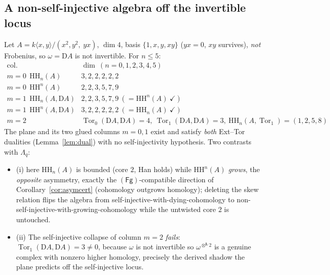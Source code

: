 \documentclass[11pt]{amsart}
\theoremstyle{definition}
\newcommand{\HH}{\mathrm{HH}}
\newcommand{\D}{\mathrm{D}}
\newcommand{\Tor}{\operatorname{Tor}}
\newcommand{\Lotimes}{\otimes^{\mathbf{L}}}
\newcommand{\kk}{k}
\newcommand{\Fg}{\mathsf{(Fg)}}
\begin{document}
\subsection{A non-self-injective algebra off the invertible
locus}\label{ex:nonselfinj}
Let $A=\kk\langle x,y\rangle/(x^2,y^2,\ yx)$, $\dim4$, basis $\{1,x,y,xy\}$
($yx=0$, $xy$ survives), \emph{not} Frobenius, so $\omega=\D A$ is not
invertible. For $n\le5$:
\[
\begin{array}{c|l}
\text{col.} & \dim\ (n=0,1,2,3,4,5)\\
\hline
m{=}0\ \ \HH_n(A) & 3,2,2,2,2,2\\
m{=}0\ \ \HH^n(A) & 2,2,3,5,7,9\\
m{=}1\ \ \HH_n(A,\D A) & 2,2,3,5,7,9\ (=\HH^n(A)\ \checkmark)\\
m{=}1\ \ \HH^n(A,\D A) & 3,2,2,2,2,2\ (=\HH_n(A)\ \checkmark)\\
m{=}2 & \Tor_0(\D A,\D A)=4,\ \Tor_1(\D A,\D A)=3,\ \HH_n(A,\Tor_1)=(1,2,5,8)
\end{array}
\]
The plane and its two glued columns $m=0,1$ exist and satisfy \emph{both}
Ext--Tor dualities (Lemma~\ref{lem:dual}) with no self-injectivity hypothesis.
Two contrasts with $\Lambda_q$:
\begin{itemize}
    \item (i) here $\HH_n(A)$ is bounded (core $2$, Han
holds) while $\HH^n(A)$ \emph{grows}, the \emph{opposite} asymmetry, exactly
the $\Fg$-compatible direction of Corollary~\ref{cor:asymcert} (cohomology outgrows
homology); deleting the skew relation flips the algebra from
self-injective-with-dying-cohomology to non-self-injective-with-growing-cohomology
while the untwisted core $2$ is untouched.
    \item (ii) The self-injective collapse of
column $m=2$ \emph{fails}: $\Tor_1(\D A,\D A)=3\ne0$, because $\omega$ is not
invertible so $\omega^{\Lotimes2}$ is a genuine complex with nonzero higher
homology, precisely the derived shadow the plane predicts off the
self-injective locus.
\end{itemize}
\end{document}
